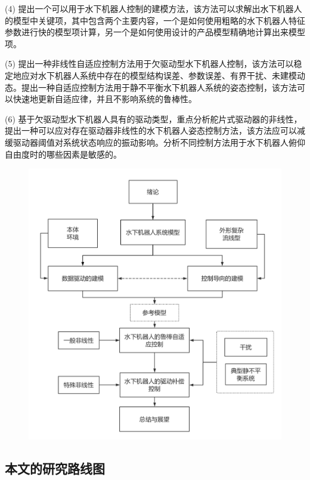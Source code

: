 (4) 提出一个可以用于水下机器人控制的建模方法，该方法可以求解出水下机器人的模型中关键项，其中包含两个主要内容，一个是如何使用粗略的水下机器人特征参数进行快的模型项计算，另一个是如何使用设计的产品模型精确地计算出来模型项。

(5) 提出一种非线性自适应控制方法用于欠驱动型水下机器人控制，该方法可以稳定地应对水下机器人系统中存在的模型结构误差、参数误差、有界干扰、未建模动态。提出一种自适应控制方法用于静不平衡水下机器人系统的姿态控制，该方法可以快速地更新自适应律，并且不影响系统的鲁棒性。

(6) 基于欠驱动型水下机器人具有的驱动类型，重点分析舵片式驱动器的非线性，提出一种可以应对存在驱动器非线性的水下机器人姿态控制方法，该方法应可以减缓驱动器阈值对系统状态响应的振动影响。分析不同控制方法用于水下机器人俯仰自由度时的哪些因素是敏感的。

\begin{figure}
\centering
\includegraphics[width=14cm]{figure/chap1/diagram_2.png}
\label{fig:chap1:F4}
\end{figure}


\subsection{本文的研究路线图 }

